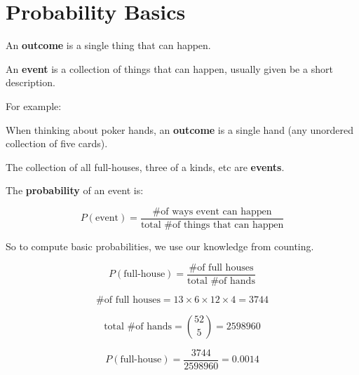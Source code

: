 \section{Probability Basics}

%
\begin{frame}

An \textbf{outcome} is a single thing that can happen.

\hfill

An \textbf{event} is a collection of things that can happen, usually given be a
short description.

\end{frame}
%

%
\begin{frame}

For example:

\hfill

When thinking about poker hands, an \textbf{outcome} is a single hand (any
unordered collection of five cards).

\hfill

The collection of all full-houses, three of a kinds, etc are \textbf{events}.

\end{frame}


%
\begin{frame}

The \textbf{probability} of an event is:

$$ P(\text{event}) = \frac{\text{\# of ways event can happen}}{\text{total \# of
things that can happen}} $$

So to compute basic probabilities, we use our knowledge from counting.

\end{frame}
%

%
\begin{frame}

$$ P(\text{full-house}) = \frac{\text{\# of full houses}}{\text{total \# of
hands}} $$

\end{frame}
%

%
\begin{frame}

$$ \text{\# of full houses} = 13 \times 6 \times 12 \times 4 = 3744 $$

$$ \text{total \# of hands} = {{52}\choose{5}} = 2598960 $$

\end{frame}
%

%
\begin{frame}

$$ P(\text{full-house}) = \frac{3744}{2598960} = 0.0014 $$

\end{frame}
%


